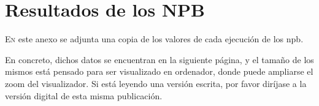 \chapter{Resultados de los NPB}
\label{chap:bench_values}

\lettrine{E}{n} este anexo se adjunta una copia de los valores de cada ejecución de los \acrlong{npb}.

En concreto, dichos datos se encuentran en la siguiente página, y el tamaño de los mismos está pensado para ser visualizado en ordenador, donde puede ampliarse el zoom del visualizador. Si está leyendo una versión escrita, por favor diríjase a la versión digital de esta misma publicación.

